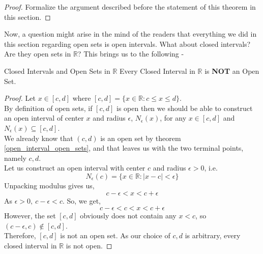 \begin{proof}
    Formalize the argument described before the statement of this theorem in this section.
\end{proof}
\noindent Now, a question might arise in the mind of the readers that everything we did in this section regarding open sets is open intervals. What about closed intervals? Are they open sets in $\mathbb{R}$? This brings us to the following -
\begin{Theorem}{Closed Intervals and Open Sets in $\mathbb{R}$}\label{closed_interval_open_sets}
    Every Closed Interval in $\mathbb{R}$ is \textbf{NOT} an Open Set.
\end{Theorem}
\begin{proof}
    Let $x\in[c,d]$ where $[c,d]=\{x\in\mathbb{R}:c\leq x\leq d\}$.\\
    By definition of open sets, if $[c,d]$ is open then we should be able to construct an open interval of center $x$ and radius $\epsilon$, $N_{\epsilon}(x)$, for any $x\in[c,d]$ and $N_{\epsilon}(x)\subseteq[c,d]$.\\
    We already know that $(c,d)$ is an open set by theorem \eqref{open_interval_open_sets}, and that leaves us with the two terminal points, namely $c,d$.\\
    Let us construct an open interval with center $c$ and radius $\epsilon>0$, i.e.
    $$N_{\epsilon}(c)=\{x\in\mathbb{R}:|x-c|<\epsilon\}$$
    Unpacking modulus gives us,
    $$c-\epsilon<x<c+\epsilon$$
    As $\epsilon>0,\ c-\epsilon<c$. So, we get,
    $$c-\epsilon<c<x<c+\epsilon$$
    However, the set $[c,d]$ obviously does not contain any $x<c$, so $(c-\epsilon,c)\notin[c,d]$.\\
    Therefore, $[c,d]$ is not an open set. As our choice of $c,d$ is arbitrary, every closed interval in $\mathbb{R}$ is not open.
\end{proof}
